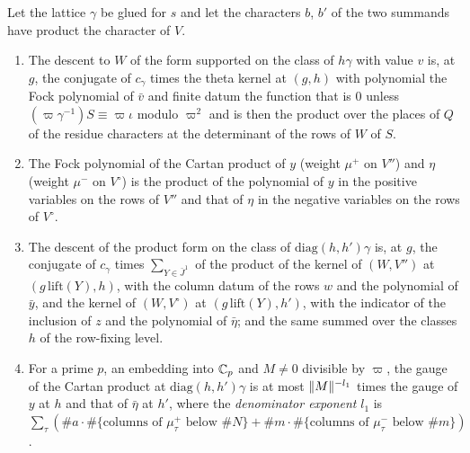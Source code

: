 \begin{lemma}\label{lem:product-descent}
Let the lattice $\gamma$ be glued for $s$ and let the characters $b$, $b'$ of the two summands have product the character of $V$.
\begin{enumerate}[label=\textup{(\alph*)}]
\item The descent to $W$ of the form supported on the class of $h\gamma$ with value $v$ is, at $g$, the conjugate of $c_\gamma$ times the theta kernel at $(g,h)$ with polynomial the Fock polynomial of $\bar v$ and finite datum the function that is $0$ unless
$(\varpi\gamma^{-1})S\equiv\varpi\iota$ modulo $\varpi^2$ and is then the product over the places of $Q$ of the residue characters at the determinant of the rows of $W$ of $S$.
\item The Fock polynomial of the Cartan product of $y$ (weight $\mu^+$ on $V''$) and $\eta$ (weight $\mu^-$ on $V^\circ$) is the product of the polynomial of $y$ in the positive variables on the rows of $V''$ and that of $\eta$ in the negative variables on the rows of
$V^\circ$.
\item The descent of the product form on the class of $\mathrm{diag}(h,h')\gamma$ is, at $g$, the conjugate of $c_\gamma$ times $\sum_{Y\in\bar J^1}$ of the product of the kernel of $(W,V'')$ at $(g\,\mathrm{lift}(Y),h)$, with the column datum of the rows $w$ and the polynomial of $\bar y$,
and the kernel of $(W,V^\circ)$ at $(g\,\mathrm{lift}(Y),h')$, with the indicator of the inclusion of $z$ and the polynomial of $\bar\eta$; and the same summed over the classes $h$ of the row-fixing level.
\item For a prime $p$, an embedding into $\mathbb{C}_p$ and $M\ne0$ divisible by $\varpi$, the gauge of the Cartan product at $\mathrm{diag}(h,h')\gamma$ is at most $\lVert M\rVert^{-l_1}$ times the gauge of $y$ at $h$ and that of $\bar\eta$ at $h'$, where the
\emph{denominator exponent} $l_1$ is $\sum_\tau(\#a\cdot\#\{\text{columns of }\mu^+_\tau\text{ below }\#N\}+\#m\cdot\#\{\text{columns of }\mu^-_\tau\text{ below }\#m\})$.
\end{enumerate}
\end{lemma}

